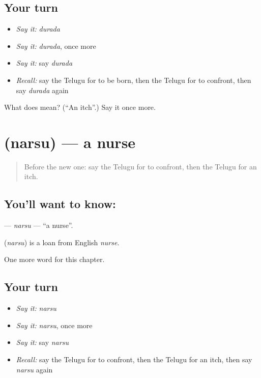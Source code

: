 \subsection*{Your turn}
\begin{itemize}
\raggedright
  \item \emph{Say it:} \emph{durada}
  \item \emph{Say it:} \emph{durada}, once more
  \item \emph{Say it:} say \emph{durada}
  \item \emph{Recall:} say the Telugu for to be born, then the Telugu for to confront, then say \emph{durada} again
\end{itemize}

\begin{tcolorbox}[breakable,colback=teal!4,colframe=teal!35!black,title={Before you move on}]
What does  mean? (\textquotedblleft{}An itch\textquotedblright{}.) Say it once more.
\end{tcolorbox}
\section[\texorpdfstring{\te{నర్సు} (narsu)}{నర్సు (narsu)}]{ (narsu) — a nurse}

\label{lesson:TE-C209-narsu}



\begin{quote}
Before the new one: say the Telugu for to confront, then the Telugu for an itch.
\end{quote}

\subsection*{You'll want to know: }
\textbf{} — \emph{narsu} — \textquotedblleft{}a nurse\textquotedblright{}.

\begin{cousinweb}
\textbf{} (\emph{narsu}) is a loan from English \emph{nurse}.
\end{cousinweb}

\begin{grammarlens}[title={What you've built}]
One more word for this chapter.
\end{grammarlens}

\subsection*{Your turn}
\begin{itemize}
\raggedright
  \item \emph{Say it:} \emph{narsu}
  \item \emph{Say it:} \emph{narsu}, once more
  \item \emph{Say it:} say \emph{narsu}
  \item \emph{Recall:} say the Telugu for to confront, then the Telugu for an itch, then say \emph{narsu} again
\end{itemize}

